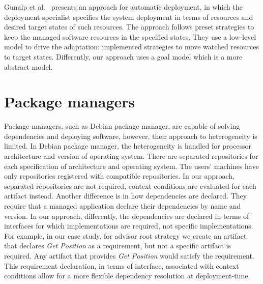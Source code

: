 Gunalp et al.~\citep{gunalp_rondo_2015} presents an approach for automatic deployment, in which the deployment specialist specifies the system deployment in terms of resources and desired target states of such resources. The approach follows preset strategies to keep the managed software resources in the specified states. They use a low-level model to drive the adaptation: implemented strategies to move watched resources to target states. Differently, our approach uses a goal model which is a more abstract model.


\section{Package managers}
Package managers, such as Debian package manager\cite{aoki_debian_2016}, are capable of solving dependencies and deploying software, however, their approach to heterogeneity is limited. In Debian package manager, the heterogeneity is handled for processor architecture and version of operating system. There are separated repositories for each specification of architecture and operating system. The users' machines have only repositories registered with compatible repositories.
In our approach, separated repositories are not required, context conditions are evaluated for each artifact instead.
Another difference is in how dependencies are declared. They require that a managed application declare their dependencies by name and version. In our approach, differently, the dependencies are declared in terms of interfaces for which implementations are required, not specific implementations. For example, in our case study, for advisor root strategy we create an artifact that declares \emph{Get Position} as a requirement, but not a specific artifact is required. Any artifact that provides \emph{Get Position} would satisfy the requirement. This requirement declaration, in terms of interface, associated with context conditions allow
for a more flexible dependency resolution at deployment-time.

